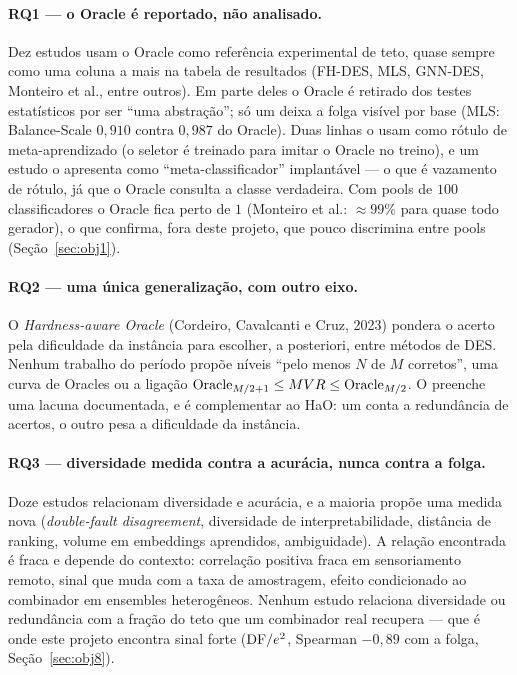 \paragraph{RQ1 --- o Oracle é reportado, não analisado.} Dez estudos usam o
Oracle como referência experimental de teto, quase sempre como uma coluna a mais
na tabela de resultados (FH-DES, MLS, GNN-DES, Monteiro et al., entre outros). Em
parte deles o Oracle é retirado dos testes estatísticos por ser ``uma
abstração''; só um deixa a folga visível por base (MLS: Balance-Scale $0{,}910$
contra $0{,}987$ do Oracle). Duas linhas o usam como rótulo de meta-aprendizado
(o seletor é treinado para imitar o Oracle no treino), e um estudo o apresenta
como ``meta-classificador'' implantável --- o que é vazamento de rótulo, já que o
Oracle consulta a classe verdadeira. Com pools de $100$ classificadores o Oracle
fica perto de $1$ (Monteiro et al.: $\approx99\%$ para quase todo gerador), o que
confirma, fora deste projeto, que  pouco discrimina entre pools
(Seção~\ref{sec:obj1}).

\paragraph{RQ2 --- uma única generalização, com outro eixo.} O
\emph{Hardness-aware Oracle} (Cordeiro, Cavalcanti e Cruz, 2023) pondera o acerto pela
dificuldade da instância para escolher, a posteriori, entre métodos de DES.
Nenhum trabalho do período propõe níveis ``pelo menos $N$ de $M$ corretos'', uma
curva de Oracles ou a ligação $\text{Oracle}_{M/2+1}\le MVR\le\text{Oracle}_{M/2}$. O  preenche
uma lacuna documentada, e é complementar ao HaO: um conta a redundância de
acertos, o outro pesa a dificuldade da instância.

\paragraph{RQ3 --- diversidade medida contra a acurácia, nunca contra a folga.}
Doze estudos relacionam diversidade e acurácia, e a maioria propõe uma medida
nova (\emph{double-fault disagreement}, diversidade de interpretabilidade,
distância de ranking, volume em embeddings aprendidos, ambiguidade). A relação
encontrada é fraca e depende do contexto: correlação positiva fraca em
sensoriamento remoto, sinal que muda com a taxa de amostragem, efeito
condicionado ao combinador em ensembles heterogêneos. Nenhum estudo relaciona
diversidade ou redundância com a fração do teto que um combinador real recupera
--- que é onde este projeto encontra sinal forte ($\mathrm{DF}/e^{2}$, Spearman $-0{,}89$ com
a folga, Seção~\ref{sec:obj8}).

